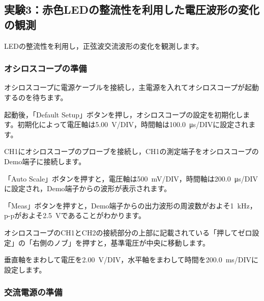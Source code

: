 \subsection{実験3：赤色LEDの整流性を利用した電圧波形の変化の観測}

LEDの整流性を利用し，正弦波交流波形の変化を観測します。

\subsubsection{オシロスコープの準備}

\begin{procedure}[leftmargin=*, labelsep=0.8em]
  \item オシロスコープに電源ケーブルを接続し，主電源を入れてオシロスコープが起動するのを待ちます。
  \item 起動後，「Default Setup」ボタンを押し，オシロスコープの設定を初期化します。初期化によって電圧軸は\SI{5.00}{V}/DIV，時間軸は\SI{100.0}{\micro s}/DIVに設定されます。
  \item CH1にオシロスコープのプローブを接続し，CH1の測定端子をオシロスコープのDemo端子に接続します。
  \item 「Auto Scale」ボタンを押すと，電圧軸は\SI{500}{mV}/DIV，時間軸は\SI{200.0}{\micro s}/DIVに設定され，Demo端子からの波形が表示されます。
  \item 「Meas」ボタンを押すと，Demo端子からの出力波形の周波数がおよそ\SI{1}{kHz}，p-pがおよそ\SI{2.5}{V}であることがわかります。
  \item オシロスコープのCH1とCH2の接続部分の上部に記載されている「押してゼロ設定」の「右側のノブ」を押すと，基準電圧が中央に移動します。
  \item 垂直軸をまわして電圧を\SI{2.00}{V}/DIV，水平軸をまわして時間を\SI{200.0}{ms}/DIVに設定します。
\end{procedure}

\subsubsection{交流電源の準備}


